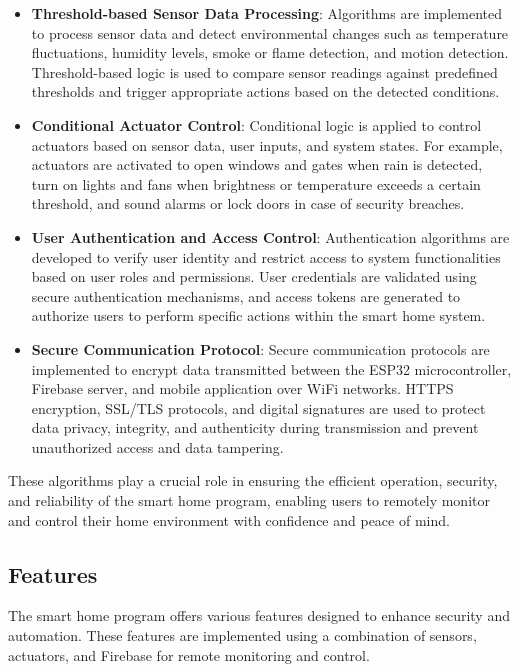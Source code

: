 \begin{itemize}
    \item \textbf{Threshold-based Sensor Data Processing}: Algorithms are implemented to process sensor data and detect environmental changes such as temperature fluctuations, humidity levels, smoke or flame detection, and motion detection. Threshold-based logic is used to compare sensor readings against predefined thresholds and trigger appropriate actions based on the detected conditions.

    \item \textbf{Conditional Actuator Control}: Conditional logic is applied to control actuators based on sensor data, user inputs, and system states. For example, actuators are activated to open windows and gates when rain is detected, turn on lights and fans when brightness or temperature exceeds a certain threshold, and sound alarms or lock doors in case of security breaches.

    \item \textbf{User Authentication and Access Control}: Authentication algorithms are developed to verify user identity and restrict access to system functionalities based on user roles and permissions. User credentials are validated using secure authentication mechanisms, and access tokens are generated to authorize users to perform specific actions within the smart home system.

    \item \textbf{Secure Communication Protocol}: Secure communication protocols are implemented to encrypt data transmitted between the ESP32 microcontroller, Firebase server, and mobile application over WiFi networks. HTTPS encryption, SSL/TLS protocols, and digital signatures are used to protect data privacy, integrity, and authenticity during transmission and prevent unauthorized access and data tampering.
\end{itemize}

These algorithms play a crucial role in ensuring the efficient operation, security, and reliability of the smart home program, enabling users to remotely monitor and control their home environment with confidence and peace of mind.

\subsection{Features}

The smart home program offers various features designed to enhance security and automation. These features are implemented using a combination of sensors, actuators, and Firebase for remote monitoring and control.

